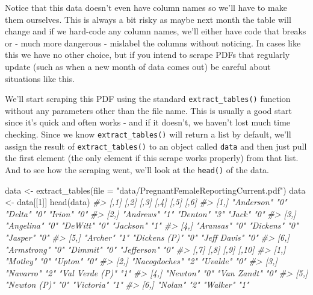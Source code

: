 \documentclass[
]{krantz}
\makeatletter
\newenvironment{Shaded}{\begin{snugshade}}{\end{snugshade}}
\newcommand{\AttributeTok}[1]{\textcolor[rgb]{0.61,0.61,0.61}{#1}}
\newcommand{\CommentTok}[1]{\textcolor[rgb]{0.37,0.37,0.37}{\textit{#1}}}
\newcommand{\DecValTok}[1]{\textcolor[rgb]{0.06,0.06,0.06}{#1}}
\newcommand{\FunctionTok}[1]{\textcolor[rgb]{0,0,0}{#1}}
\newcommand{\NormalTok}[1]{#1}
\newcommand{\OtherTok}[1]{\textcolor[rgb]{0.37,0.37,0.37}{#1}}
\newcommand{\StringTok}[1]{\textcolor[rgb]{0.5,0.5,0.5}{#1}}
\newenvironment{kframe}{%
\medskip{}
\setlength{\fboxsep}{.8em}
 \def\at@end@of@kframe{}%
 \ifinner\ifhmode%
  \def\at@end@of@kframe{\end{minipage}}%
  \begin{minipage}{\columnwidth}%
 \fi\fi%
 \def\FrameCommand##1{\hskip\@totalleftmargin \hskip-\fboxsep
 \colorbox{shadecolor}{##1}\hskip-\fboxsep
     \hskip-\linewidth \hskip-\@totalleftmargin \hskip\columnwidth}%
 \MakeFramed {\advance\hsize-\width
   \@totalleftmargin\z@ \linewidth\hsize
   \@setminipage}}%
 {\par\unskip\endMakeFramed%
 \at@end@of@kframe}
\renewenvironment{Shaded}{\begin{kframe}}{\end{kframe}}
\makeatother
\begin{document}
Notice that this data doesn't even have column names so
we'll have to make them ourselves. This is always a bit
risky as maybe next month the table will change and if we
hard-code any column names, we'll either have code that
breaks or - much more dangerous - mislabel the columns
without noticing. In cases like this we have no other
choice, but if you intend to scrape PDFs that regularly
update (such as when a new month of data comes out) be
careful about situations like this.

We'll start scraping this PDF using the standard
\texttt{extract\_tables()} function without any parameters
other than the file name. This is usually a good start since
it's quick and often works - and if it doesn't, we haven't
lost much time checking. Since we know
\texttt{extract\_tables()} will return a list by default,
we'll assign the result of \texttt{extract\_tables()} to an
object called \texttt{data} and then just pull the first
element (the only element if this scrape works properly)
from that list. And to see how the scraping went, we'll look
at the \texttt{head()} of the data.

\begin{Shaded}
\begin{Highlighting}[]
\NormalTok{data }\OtherTok{\textless{}{-}} \FunctionTok{extract\_tables}\NormalTok{(}\AttributeTok{file =} \StringTok{"data/PregnantFemaleReportingCurrent.pdf"}\NormalTok{)}
\NormalTok{data }\OtherTok{\textless{}{-}}\NormalTok{ data[[}\DecValTok{1}\NormalTok{]]}
\FunctionTok{head}\NormalTok{(data)}
\CommentTok{\#\textgreater{}      [,1]        [,2] [,3]          [,4] [,5]         [,6]}
\CommentTok{\#\textgreater{} [1,] "Anderson"  "0"  "Delta"       "0"  "Irion"      "0" }
\CommentTok{\#\textgreater{} [2,] "Andrews"   "1"  "Denton"      "3"  "Jack"       "0" }
\CommentTok{\#\textgreater{} [3,] "Angelina"  "0"  "DeWitt"      "0"  "Jackson"    "1" }
\CommentTok{\#\textgreater{} [4,] "Aransas"   "0"  "Dickens"     "0"  "Jasper"     "0" }
\CommentTok{\#\textgreater{} [5,] "Archer"    "1"  "Dickens (P)" "0"  "Jeff Davis" "0" }
\CommentTok{\#\textgreater{} [6,] "Armstrong" "0"  "Dimmit"      "0"  "Jefferson"  "0" }
\CommentTok{\#\textgreater{}      [,7]          [,8] [,9]            [,10]}
\CommentTok{\#\textgreater{} [1,] "Motley"      "0"  "Upton"         "0"  }
\CommentTok{\#\textgreater{} [2,] "Nacogdoches" "2"  "Uvalde"        "0"  }
\CommentTok{\#\textgreater{} [3,] "Navarro"     "2"  "Val Verde (P)" "1"  }
\CommentTok{\#\textgreater{} [4,] "Newton"      "0"  "Van Zandt"     "0"  }
\CommentTok{\#\textgreater{} [5,] "Newton (P)"  "0"  "Victoria"      "1"  }
\CommentTok{\#\textgreater{} [6,] "Nolan"       "2"  "Walker"        "1"}
\end{Highlighting}
\end{Shaded}
\end{document}
